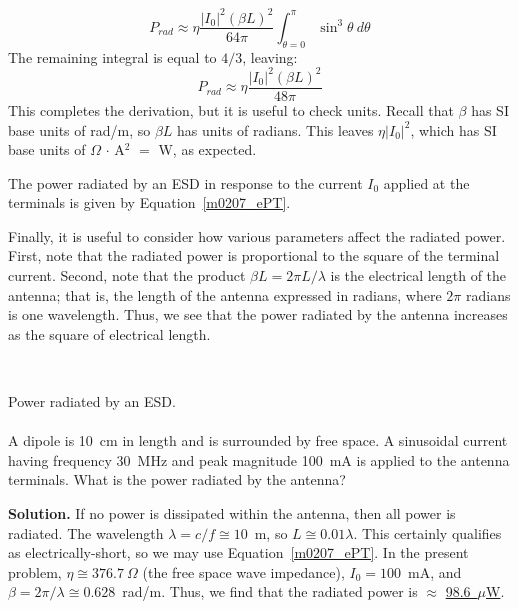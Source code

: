 %
\begin{equation}
P_{rad} \approx \eta \frac{\left|I_0\right|^2\left(\beta L\right)^2}{64\pi}\int_{\theta=0}^{\pi} { \sin^3 \theta~d\theta } 
\end{equation}
%
The remaining integral is equal to $4/3$, leaving:
%
\begin{equation}
\boxed{
P_{rad} \approx \eta \frac{\left|I_0\right|^2\left(\beta L\right)^2}{48\pi}
}
\label{m0207_ePT}
\end{equation}
%
This completes the derivation, but it is useful to check units.  
Recall that $\beta$ has SI base units of rad/m, so $\beta L$ has units of radians.
This leaves $\eta\left|I_0\right|^2$, which has SI base units of $\Omega$ $\cdot$ A$^2$ $=$ W, as expected.

\begin{mdframed}[backgroundcolor=yellow!20,nobreak=true] 
The power radiated by an ESD in response to the current $I_0$ applied at the terminals is given by Equation~\ref{m0207_ePT}.
\end{mdframed}

Finally, it is useful to consider how various parameters affect the radiated power.
First, note that the radiated power is proportional to the square of the terminal current.
Second, note that the product $\beta L=2\pi L/\lambda$ is the electrical length
of the antenna; that is,  the length of the antenna expressed in radians, where $2\pi$ radians is one wavelength.
Thus, we see that the power radiated by the antenna increases as the square of electrical length.

~\\ \begin{example} 
\begin{mdframed}[backgroundcolor=brown!20,linecolor=brown!20]\raggedright
Power radiated by an ESD. 
\\~\\
A dipole is 10~cm in length and is surrounded by free space.
A sinusoidal current having frequency 30~MHz and peak magnitude 100~mA is applied to the antenna terminals.
What is the power radiated by the antenna?

{\bf Solution.}
If no power is dissipated within the antenna, then all power is radiated.
The wavelength $\lambda=c/f \cong 10$~m, so $L \cong 0.01\lambda$.
This certainly qualifies as electrically-short, so we may use Equation~\ref{m0207_ePT}.
In the present problem, $\eta\cong 376.7~\Omega$ (the free space wave impedance), $I_0=100$~mA, and $\beta=2\pi/\lambda\cong 0.628$~rad/m.
Thus, we find that the radiated power is $\approx$ \underline{98.6~$\mu$W}.
\end{mdframed}
\end{example}


